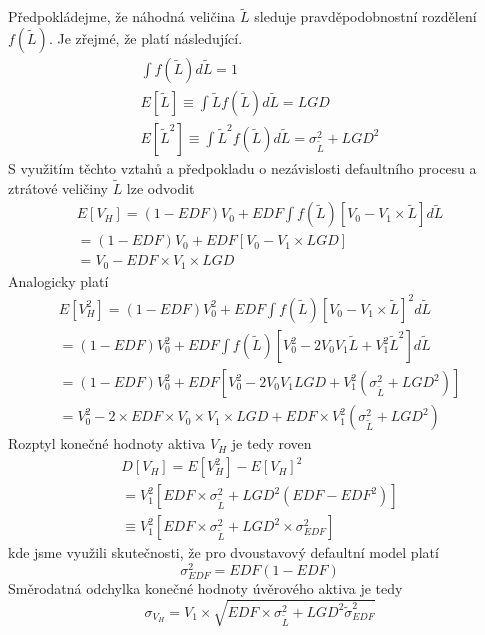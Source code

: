 Předpokládejme, že náhodná veličina $\tilde{L}$ sleduje pravděpodobnostní rozdělení $f(\tilde{L})$. Je zřejmé, že platí následující.
\begin{gather}
\int f(\tilde{L})d\tilde{L} = 1\\
E[\tilde{L}] \equiv \int \tilde{L}f(\tilde{L})d{\tilde{L}} = LGD\\
E[\tilde{L}^2] \equiv \int \tilde{L}^2 f(\tilde{L})d \tilde{L} = \sigma_{\tilde{L}}^2 + LGD^2
\end{gather}
S využitím těchto vztahů a předpokladu o nezávislosti defaultního procesu a ztrátové veličiny $\tilde{L}$ lze odvodit
\begin{multline}
E[V_H] = (1 - EDF) V_0 + EDF \int f(\tilde{L})[V_0 - V_1 \times \tilde{L}]d\tilde{L}\\
= (1 - EDF)V_0 + EDF[V_0 - V_1 \times LGD]\\
= V_0 - EDF \times V_1 \times LGD
\end{multline}
Analogicky platí
\begin{multline}
E[V_H^2] = (1 - EDF)V_0^2 + EDF \int f(\tilde{L})[V_0 - V_1 \times \tilde{L}]^2 d \tilde{L}\\
= (1 - EDF)V_0^2 + EDF \int f(\tilde{L})[V_0^2 - 2V_0V_1\tilde{L} + V_1^2 \tilde{L}^2]d\tilde{L}\\
= (1 - EDF)V_0^2 + EDF\left[V_0^2 - 2 V_0 V_1LGD + V_1^2(\sigma_{\tilde{L}}^2 + LGD^2)\right]\\
= V_0^2 - 2\times EDF \times V_0 \times V_1 \times LGD + EDF \times V_1^2\left(\sigma_{\tilde{L}}^2 + LGD^2 \right)
\end{multline}
Rozptyl konečné hodnoty aktiva $V_H$ je tedy roven
\begin{multline}
D[V_H] = E[V_H^2] - E[V_H]^2\\
= V_1^2 \left[EDF \times \sigma_{\tilde{L}}^2 + LGD^2(EDF - EDF^2)\right]\\
\equiv V_1^2 \left[EDF \times \sigma_{\tilde{L}}^2 + LGD^2 \times \sigma_{EDF}^2\right]
\end{multline}
kde jsme využili skutečnosti, že pro dvoustavový defaultní model platí
\begin{equation}
\sigma_{EDF}^2 = EDF(1 - EDF)
\end{equation}
Směrodatná odchylka konečné hodnoty úvěrového aktiva je tedy
\begin{equation}
\sigma_{V_H} = V_1 \times \sqrt{EDF \times \sigma_{\tilde{L}}^2 + LGD^2 \tilde \sigma_{EDF}^2}
\end{equation}
